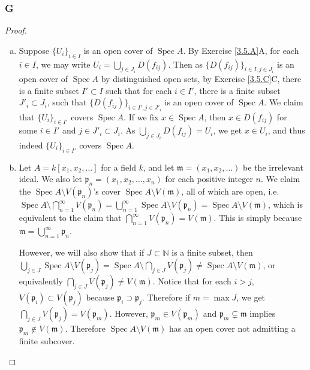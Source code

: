 \documentclass{article}
\newcommand{\N}{\mathbb{N}}
\newcommand{\frkm}{\mathfrak{m}}
\newcommand{\frkp}{\mathfrak{p}}
\DeclareMathOperator{\Spec}{\mathrm{Spec}}
\theoremstyle{definition} %
\begin{document}
\subsubsection{G}\label{3.6.G}
\begin{proof}
    \begin{enumerate}[(a)]
        \item Suppose $\{U_i\}_{i\in I}$ is an open cover of $\Spec A$. By Exercise \ref{3.5.A}A, for each $i\in I$, we may write $U_i = \bigcup_{j\in J_i} D(f_{ij})$. Then as $\{D(f_{ij})\}_{i\in I, j\in J_i}$ is an open cover of $\Spec A$ by distinguished open sets, by Exercise \ref{3.5.C}C, there is a finite subset $I'\subset I$ such that for each $i\in I'$, there is a finite subset $J'_i \subset J_i$, such that $\{ D(f_{ij})\}_{i\in I', j\in J'_i}$ is an open cover of $\Spec A$. We claim that $\{U_i\}_{i\in I'}$ covers $\Spec A$. \iffalse For any $i\in I'$, we have
        \[
        U_i = U_i \cap \Spec A = \bigcup_{j\in J_i} D(f_{ij}) \cap \bigcup_{k\in I'} \bigcup_{j\in J'_k} D(f_{kj}).
        \]
        Thus
        \[
        \bigcup_{i\in I'} \bigcup_{j\in J_i} D(f_{ij}) \cap \bigcup_{k\in I'} \bigcup_{l\in J_{k}'} D(f_{kl}).
        \]
        \fi
        If we fix $x\in \Spec A$, then $x\in D(f_{ij})$ for some $i\in I'$ and $j\in J'_i \subset J_i$. As $ \bigcup_{j\in J_i} D(f_{ij})=U_i$, we get $x\in U_i$, and thus indeed $\{U_i\}_{i\in I'}$ covers $\Spec A$.
        \item Let $A=k[x_1,x_2,\dots]$ for a field $k$, and let $\frkm=(x_1,x_2,\dots)$ be the irrelevant ideal. We also let $\frkp_n=(x_1,x_2,\dots, x_n)$ for each positive integer $n$. We claim the $\Spec A \setminus V(\frkp_n)$'s cover $\Spec A \setminus V(\frkm)$, all of which are open, i.e. $\Spec A \setminus \bigcap_{n=1}^\infty V(\frkp_n)=\bigcup_{n=1}^\infty \Spec A \setminus V(\frkp_n) = \Spec A \setminus V(\frkm)$, which is equivalent to the claim that $\bigcap_{n=1}^\infty V(\frkp_n)=V(\frkm)$. This is simply because $\frkm= \bigcup_{n=1}^\infty \frkp_n$.

        However, we will also show that if $J\subset \N$ is a finite subset, then $\bigcup_{j\in J} \Spec A \setminus V(\frkp_j) = \Spec A \setminus \bigcap_{j\in J} V(\frkp_j) \ne \Spec A \setminus V(\frkm)$, or equivalently $\bigcap_{j\in J} V(\frkp_j) \ne V(\frkm)$. Notice that for each $i>j$, $V(\frkp_i)\subset V(\frkp_j)$ because $\frkp_i\supset \frkp_j$. Therefore if $m=\max J$, we get $\bigcap_{j\in J} V(\frkp_j)=V(\frkp_m)$. However, $\frkp_m\in V(\frkp_m)$ and $\frkp_m \subsetneq \frkm$ implies $\frkp_m \notin V(\frkm)$. Therefore $\Spec A \setminus V(\frkm)$ has an open cover not admitting a finite subcover.
    \end{enumerate}
\end{proof}
\end{document}
